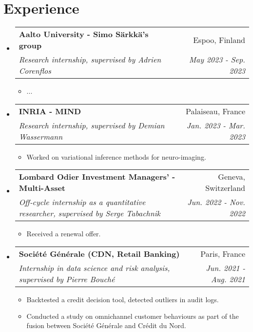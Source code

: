 \documentclass[letterpaper,10pt]{article}
\makeatletter
\newcommand{\up}[1]{\textsuperscript{#1}}
\newcommand{\resumeItem}[1]{
    \item\small{
            {#1 \vspace{-2pt}}
    }
}
\newcommand{\resumeSubheading}[4]{
    \vspace{-2pt}\item
    \begin{tabular*}{0.97\textwidth}[t]{l@{\extracolsep{\fill}}r}
        \textbf{#1}       & #2                 \\
        \textit{\small#3} & \textit{\small #4} \\
    \end{tabular*}\vspace{-7pt}
}
\newcommand{\resumeSubHeadingListStart}{\begin{itemize}[leftmargin=0.15in, label={}]}
\newcommand{\resumeSubHeadingListEnd}{\end{itemize}}
\newcommand{\resumeItemListStart}{\begin{itemize}}
\newcommand{\resumeItemListEnd}{\end{itemize}\vspace{-5pt}}
\makeatother
\begin{document}
\section{Experience}
\resumeSubHeadingListStart
\resumeSubheading
{Aalto University - Simo Särkkä's group}{Espoo, Finland}
{Research internship, supervised by Adrien Corenflos}{May 2023 - Sep. 2023}
\resumeItemListStart
\resumeItem{...}
\resumeItemListEnd
\resumeSubheading
{INRIA - MIND}{Palaiseau, France}
{Research internship, supervised by Demian Wassermann}{Jan. 2023 - Mar. 2023}
\resumeItemListStart
\resumeItem{Worked on variational inference methods for neuro-imaging.}
\resumeItemListEnd
\resumeSubheading
{Lombard Odier Investment Managers' - Multi-Asset}{Geneva, Switzerland}
{Off-cycle internship as a quantitative researcher, supervised by Serge Tabachnik}{Jun. 2022 - Nov. 2022}
\resumeItemListStart
\resumeItem{Received a renewal offer.}
\resumeItemListEnd
\resumeSubheading
{Société Générale (CDN, Retail Banking)}{Paris, France}%
{Internship in data science and risk analysis, supervised by Pierre Bouché}{Jun. 2021 - Aug. 2021}
\resumeItemListStart
\resumeItem{Backtested a credit decision tool, detected outliers in audit logs.}
\resumeItem{Conducted a study on omnichannel customer behaviours as part of the fusion between Société Générale and Crédit du Nord.}
\resumeItemListEnd
\resumeSubHeadingListEnd
\end{document}
